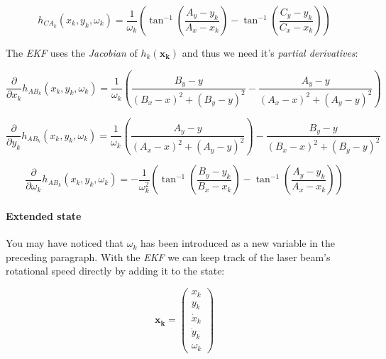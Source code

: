 \documentclass[a4paper, 12pt]{paper}
\begin{document}
\begin{equation}
    h_{CA_k}\left(x_k, y_k, \omega_k\right)
    = \frac{1}{\omega_k}\left(\tan^{-1}\left(\frac{A_y-y_k}{A_x-x_k}\right)
        - \tan^{-1}\left(\frac{C_y-y_k}{C_x-x_k}\right)\right)
    \label{eq:h_ca}
\end{equation}

The \emph{EKF} uses the \emph{Jacobian} of $h_k\left(\mathbf{x_k}\right)$ and
thus we need it's \emph{partial derivatives}:

\begin{equation}
    \frac{\partial}{\partial x_k}h_{AB_k}\left(x_k, y_k, \omega_k\right)
        = \frac{1}{\omega_k}\left(
        \frac{B_y-y}{{\left(B_x-x\right)}^2+{\left(B_y-y\right)}^2}
        - \frac{A_y-y}{{\left(A_x-x\right)}^2+{\left(A_y-y\right)}^2}\right)
    \label{eq:partial_x}
\end{equation}

\begin{equation}
    \frac{\partial}{\partial y_k}h_{AB_k}\left(x_k, y_k, \omega_k\right)
        = \frac{1}{\omega_k}\left(
        \frac{A_y-y}{{\left(A_x-x\right)}^2+{\left(A_y-y\right)}^2}\right)
        - \frac{B_y-y}{{\left(B_x-x\right)}^2+{\left(B_y-y\right)}^2}
    \label{eq:partial_y}
\end{equation}

\begin{equation}
    \frac{\partial}{\partial \omega_k}h_{AB_k}\left(x_k, y_k, \omega_k\right)
        = - \frac{1}{\omega_k^2}
        \left(\tan^{-1}\left(\frac{B_y-y_k}{B_x-x_k}\right)
        - \tan^{-1}\left(\frac{A_y-y_k}{A_x-x_k}\right)\right)
    \label{eq:partial_omega}
\end{equation}


\paragraph{Extended state}

You may have noticed that $\omega_k$ has been introduced as a new variable in
the preceding paragraph. With the \emph{EKF} we can keep track of the
laser beam's rotational speed directly by adding it to the state:


\begin{equation}
    \mathbf{x_k} = \left( \begin{array}{c} x_k     \\
                                           y_k     \\
                                           \dot{x}_k \\
                                           \dot{y}_k \\
                                           \omega_k \end{array} \right)
\label{eq:ekf_state}
\end{equation}
\end{document}
